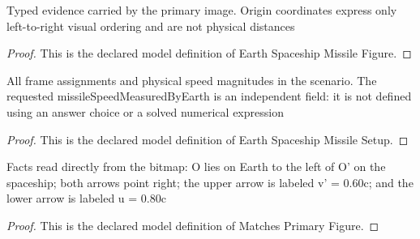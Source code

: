 \begin{definition}
  \label{def:physics:phyx-mini-0553:phyxminiproblems-problemphyxmini0553-earthspaceshipmissilefigure}
  Typed evidence carried by the primary image. Origin coordinates express only left-to-right visual ordering and are not physical distances
\end{definition}
\begin{proof}
  This is the declared model definition of Earth Spaceship Missile Figure.
\end{proof}
\begin{definition}
  \label{def:physics:phyx-mini-0553:phyxminiproblems-problemphyxmini0553-earthspaceshipmissilesetup}
  All frame assignments and physical speed magnitudes in the scenario. The requested missileSpeedMeasuredByEarth is an independent field: it is not defined using an answer choice or a solved numerical expression
\end{definition}
\begin{proof}
  This is the declared model definition of Earth Spaceship Missile Setup.
\end{proof}
\begin{definition}
  \label{def:physics:phyx-mini-0553:phyxminiproblems-problemphyxmini0553-matchesprimaryfigure}
  Facts read directly from the bitmap: O lies on Earth to the left of O' on the spaceship; both arrows point right; the upper arrow is labeled v' = 0.60c; and the lower arrow is labeled u = 0.80c
\end{definition}
\begin{proof}
  This is the declared model definition of Matches Primary Figure.
\end{proof}
